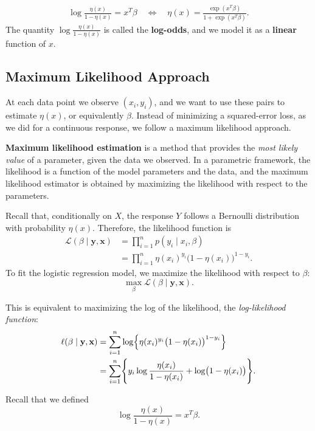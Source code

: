 \documentclass[
]{book}
\begin{document}
\begin{align*}
\log \frac{\eta(x)}{1-\eta(x)} = x^T \beta
\quad\Leftrightarrow\quad
\eta(x) =  \frac{\exp (x^T \beta)}{1 + \exp (x^T \beta)}.
\end{align*}
The quantity \(\log\frac{\eta(x)}{1-\eta(x)}\) is called the \textbf{log-odds}, and we model it as a \textbf{linear} function of \(x\).

\subsection{Maximum Likelihood Approach}\label{maximum-likelihood-approach}

At each data point we observe \((x_i, y_i)\), and we want to use these pairs to estimate \(\eta(x)\), or equivalently \(\beta\). Instead of minimizing a squared-error loss, as we did for a continuous response, we follow a maximum likelihood approach.

\textbf{Maximum likelihood estimation} is a method that provides the \emph{most likely value} of a parameter, given the data we observed. In a parametric framework, the likelihood is a function of the model parameters and the data, and the maximum likelihood estimator is obtained by maximizing the likelihood with respect to the parameters.

Recall that, conditionally on \(X\), the response \(Y\) follows a Bernoulli distribution with probability \(\eta(x)\). Therefore, the likelihood function is
\begin{align*}
\mathcal{L}(\beta \mid \mathbf{y}, \mathbf{x}) &= \prod_{i=1}^{n} p(y_i \mid x_i, \beta)\\
 &= \prod_{i=1}^{n} \eta(x_i)^{y_i} \bigl(1-\eta(x_i)\bigr)^{1-y_i}.
\end{align*}
To fit the logistic regression model, we maximize the likelihood with respect to \(\beta\):
\[\max_{\beta} \mathcal{L}(\beta \mid \mathbf{y}, \mathbf{x}). \]

This is equivalent to maximizing the log of the likelihood, the \emph{log-likelihood function}:
\begin{align*}
\ell (\beta \mid \mathbf{y}, \mathbf{x}) &= \sum_{i=1}^{n} \log \Bigl\{\eta(x_i)^{y_i} \bigl(1-\eta(x_i)\bigr)^{1-y_i} \Bigr\}\\
&= \sum_{i=1}^{n} \Biggl\{ y_i \log \frac{\eta(x_i)}{1- \eta(x_i)} + \log \bigl(1-\eta(x_i)\bigr)\Biggr\}.
\end{align*}

Recall that we defined
\[\log \frac{\eta(x)}{1-\eta(x)} = x^T \beta.\]
\end{document}
